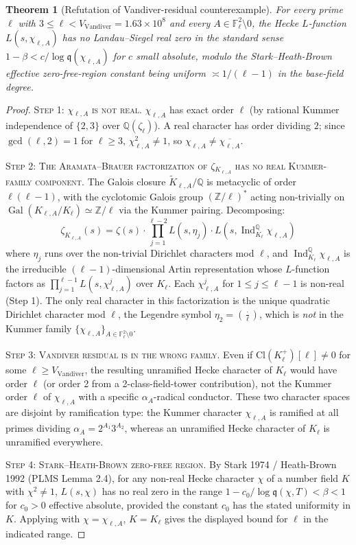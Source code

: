 \documentclass[11pt]{article}
\newtheorem{theorem}{Theorem}
\newcommand{\Z}{\mathbb Z}
\newcommand{\Q}{\mathbb Q}
\newcommand{\F}{\mathbb F}
\newcommand{\Gal}{\operatorname{Gal}}
\newcommand{\Ind}{\operatorname{Ind}}
\begin{document}
\begin{theorem}[Refutation of Vandiver-residual counterexample]\label{T:ctrex}
For every prime $\ell$ with $3\le\ell<V_{\mathrm{Vandiver}}=1.63\times 10^8$ and every $A\in\F_\ell^2\setminus 0$, the Hecke $L$-function $L(s,\chi_{\ell,A})$ has no Landau--Siegel real zero in the standard sense $1-\beta<c/\log\mathfrak q(\chi_{\ell,A})$ for $c$ small absolute, modulo the Stark--Heath-Brown effective zero-free-region constant being uniform $\asymp 1/(\ell-1)$ in the base-field degree.
\end{theorem}

\begin{proof}
\textsc{Step 1: $\chi_{\ell,A}$ is not real.}  $\chi_{\ell,A}$ has exact order $\ell$ (by rational Kummer independence of $\{2,3\}$ over $\Q(\zeta_\ell)$).  A real character has order dividing $2$; since $\gcd(\ell,2)=1$ for $\ell\ge 3$, $\chi_{\ell,A}^2\ne 1$, so $\chi_{\ell,A}\ne\overline{\chi_{\ell,A}}$.

\textsc{Step 2: The Aramata--Brauer factorization of $\zeta_{K_{\ell,A}}$ has no real Kummer-family component.}  The Galois closure $\widetilde K_{\ell,A}/\Q$ is metacyclic of order $\ell(\ell-1)$, with the cyclotomic Galois group $(\Z/\ell)^*$ acting non-trivially on $\Gal(K_{\ell,A}/K_\ell)\simeq\Z/\ell$ via the Kummer pairing.  Decomposing:
\[
\zeta_{K_{\ell,A}}(s)=\zeta(s)\cdot\prod_{j=1}^{\ell-2}L(s,\eta_j)\cdot L(s,\Ind_{K_\ell}^{\Q}\chi_{\ell,A})
\]
where $\eta_j$ runs over the non-trivial Dirichlet characters mod $\ell$, and $\Ind_{K_\ell}^{\Q}\chi_{\ell,A}$ is the irreducible $(\ell-1)$-dimensional Artin representation whose $L$-function factors as $\prod_{j=1}^{\ell-1}L(s,\chi_{\ell,A}^j)$ over $K_\ell$.  Each $\chi_{\ell,A}^j$ for $1\le j\le\ell-1$ is non-real (Step 1).  The only real character in this factorization is the unique quadratic Dirichlet character mod $\ell$, the Legendre symbol $\eta_2=\left(\frac\cdot\ell\right)$, which is \emph{not} in the Kummer family $\{\chi_{\ell,A}\}_{A\in\F_\ell^2\setminus 0}$.

\textsc{Step 3: Vandiver residual is in the wrong family.}  Even if $\mathrm{Cl}(K_\ell^+)[\ell]\ne 0$ for some $\ell\ge V_{\mathrm{Vandiver}}$, the resulting unramified Hecke character of $K_\ell$ would have order $\ell$ (or order 2 from a 2-class-field-tower contribution), not the Kummer order $\ell$ of $\chi_{\ell,A}$ with a specific $\alpha_A$-radical conductor.  These two character spaces are disjoint by ramification type: the Kummer character $\chi_{\ell,A}$ is ramified at all primes dividing $\alpha_A=2^{A_1}3^{A_2}$, whereas an unramified Hecke character of $K_\ell$ is unramified everywhere.

\textsc{Step 4: Stark--Heath-Brown zero-free region.}  By Stark 1974 / Heath-Brown 1992 (PLMS Lemma 2.4), for any non-real Hecke character $\chi$ of a number field $K$ with $\chi^2\ne 1$, $L(s,\chi)$ has no real zero in the range $1-c_0/\log\mathfrak q(\chi,T)<\beta<1$ for $c_0>0$ effective absolute, provided the constant $c_0$ has the stated uniformity in $K$.  Applying with $\chi=\chi_{\ell,A}$, $K=K_\ell$ gives the displayed bound for $\ell$ in the indicated range.
\end{proof}
\end{document}
